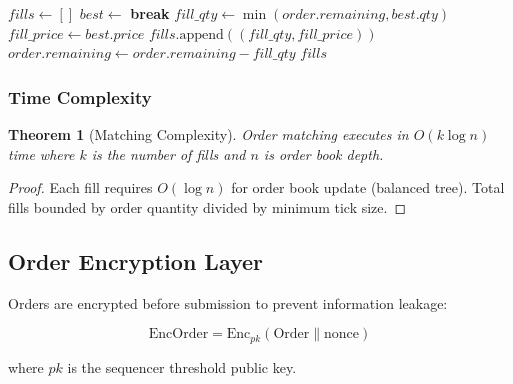 \documentclass[11pt,a4paper]{article}
\newtheorem{theorem}{Theorem}
\begin{document}
\begin{algorithm}
\caption{Order Matching Algorithm}
\begin{algorithmic}[1]
    \State $fills \gets []$
        \State $best \gets$ 
            \State \textbf{break}
        \EndIf
        \State $fill\_qty \gets \min(order.remaining, best.qty)$
        \State $fill\_price \gets best.price$ 
        \State $fills.\text{append}((fill\_qty, fill\_price))$
        \State $order.remaining \gets order.remaining - fill\_qty$
        \State {}
    \EndWhile
        \State {}
    \EndIf
    \State \Return $fills$
\EndProcedure
\end{algorithmic}
\end{algorithm}

\subsubsection{Time Complexity}

\begin{theorem}[Matching Complexity]
Order matching executes in $O(k \log n)$ time where $k$ is the number of fills and $n$ is order book depth.
\end{theorem}

\begin{proof}
Each fill requires $O(\log n)$ for order book update (balanced tree). Total fills bounded by order quantity divided by minimum tick size.
\end{proof}

\subsection{Order Encryption Layer}

Orders are encrypted before submission to prevent information leakage:

\begin{equation}
    \text{EncOrder} = \text{Enc}_{pk}(\text{Order} \| \text{nonce})
\end{equation}

where $pk$ is the sequencer threshold public key.
\end{document}
